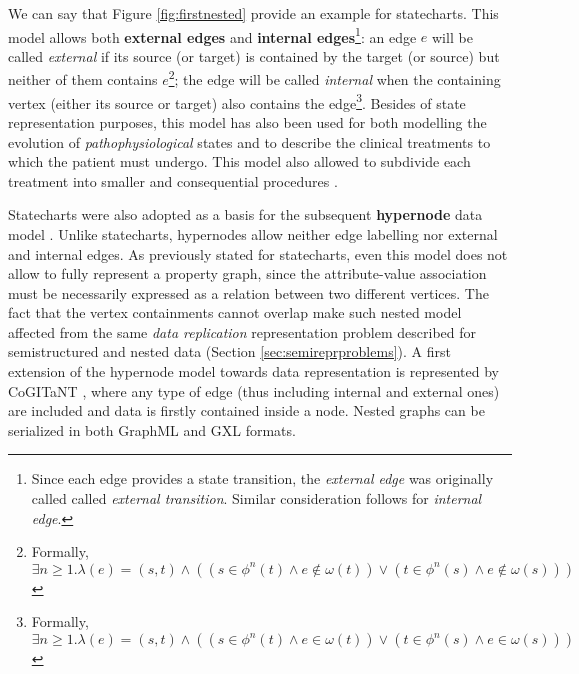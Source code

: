 We can say that Figure \ref{fig:firstnested} provide an example for statecharts. This model allows both \textbf{external edges} and \textbf{internal edges}\footnote{Since each edge provides a state transition, the \textit{external edge} was originally called called \textit{external transition}. Similar consideration follows for \textit{internal edge}.}: an edge  $e$ will be called \textit{external} if its source (or target) is contained by the target (or source) but neither of them contains $e$\footnote{Formally, $\exists n\geq 1.\lambda(e)=(s,t)\wedge ((s\in\phi^n(t) \wedge e\notin \omega(t))\vee (t\in \phi^n(s)\wedge e\notin \omega(s)))$}; the edge will be called \textit{internal} when the containing vertex (either its source or target) also contains the edge\footnote{Formally, $\exists n\geq 1.\lambda(e)=(s,t)\wedge ((s\in\phi^n(t) \wedge e\in \omega(t))\vee (t\in \phi^n(s)\wedge e\in \omega(s)))$}. Besides of state representation purposes, this model has also been  used for both modelling the evolution of \textit{pathophysiological} states and to describe the clinical treatments to which the patient must undergo. This model also allowed to subdivide each treatment  into smaller and consequential procedures \cite{NestedGlaucoma}.

Statecharts were also adopted as a basis for the subsequent \textbf{hypernode} data model \cite{Poulovassilis1994}. Unlike statecharts, hypernodes allow neither edge labelling nor external and internal edges. As previously stated for statecharts, even this model does not allow to fully represent a property graph, since the attribute-value association must be necessarily expressed as a relation between two different vertices. The fact that the vertex containments cannot overlap make such nested model affected from the same \textit{data replication} representation problem described for semistructured and nested data (Section \vref{sec:semireprproblems}). A first extension of the hypernode model towards data representation is represented by CoGITaNT \cite{GenestS98}, where any type of edge (thus including internal and external ones) are included and data is firstly contained inside a node. Nested graphs can be serialized in both GraphML \cite{graphml} and GXL \cite{GXL} formats. %

